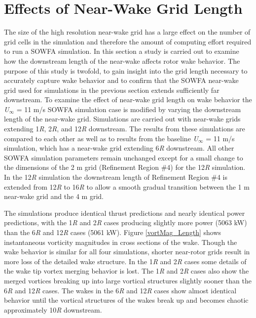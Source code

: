 \section{Effects of Near-Wake Grid Length}\label{section5-4-2}
The size of the high resolution near-wake grid has a large effect on the number of grid cells in the simulation and therefore the amount of computing effort required to run a SOWFA simulation. In this section a study is carried out to examine how the downstream length of the near-wake affects rotor wake behavior. The purpose of this study is twofold, to gain insight into the grid length necessary to accurately capture wake behavior and to confirm that the SOWFA near-wake grid used for simulations in the previous section extends sufficiently far downstream. To examine the effect of near-wake grid length on wake behavior the \emph{U$_\infty$} = 11 m/s SOWFA simulation case is modified by varying the downstream length of the near-wake grid. Simulations are carried out with near-wake grids extending 1\emph{R}, 2\emph{R}, and 12\emph{R} downstream. The results from these simulations are compared to each other as well as to results from the baseline \emph{U$_\infty$} = 11 m/s simulation, which has a near-wake grid extending 6\emph{R} downstream. All other SOWFA simulation parameters remain unchanged except for a small change to the dimensions of the 2 m grid (Refinement Region \#4) for the 12\emph{R} simulation. In the 12\emph{R} simulation the downstream length of Refinement Region \#4 is extended from 12\emph{R} to 16\emph{R} to allow a smooth gradual transition between the 1 m near-wake grid and the 4 m grid.


The simulations produce identical thrust predictions and nearly identical power predictions, with the 1\emph{R} and 2\emph{R} cases producing slightly more power (5063 kW) than the 6\emph{R} and 12\emph{R} cases (5061 kW). Figure \ref{vortMag_Length} shows instantaneous vorticity magnitudes in cross sections of the wake. Though the wake behavior is similar for all four simulations, shorter near-rotor grids result in more loss of the detailed wake structure.  In the 1\emph{R} and 2\emph{R} cases some details of the wake tip vortex merging behavior is lost. The 1\emph{R} and 2\emph{R} cases also show the merged vortices breaking up into large vortical structures slightly sooner than the 6\emph{R} and 12\emph{R} cases. The wakes in the 6\emph{R} and 12\emph{R} cases show almost identical behavior until the vortical structures of the wakes break up and becomes chaotic approximately 10\emph{R} downstream.


